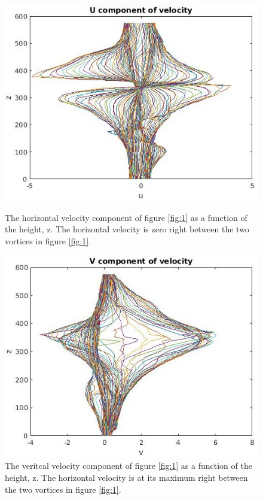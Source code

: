 \documentclass[english,a4paper,12pt]{article}
\begin{document}
\begin{figure}[H]
\centering
\begin{minipage}{.45\textwidth}
    \centering
    \includegraphics[width=1.1\linewidth]{u_y.jpg}
    \caption{The horizontal velocity component of figure \ref{fig:1} as a function of the height, z. The horizontal velocity is zero right between the two vortices in figure \ref{fig:1}.}
    \label{fig:2}
\end{minipage}%
\hspace{1cm}
\begin{minipage}{.45\textwidth}
    \centering
    \includegraphics[width=1.1\linewidth]{vmotz.jpg}
    \caption{The veritcal velocity component of figure \ref{fig:1} as a function of the height, z. The horizontal velocity is at its maximum right between the two vortices in figure \ref{fig:1}.}
    \label{fig:3}
\end{minipage}
\end{figure}
\end{document}
